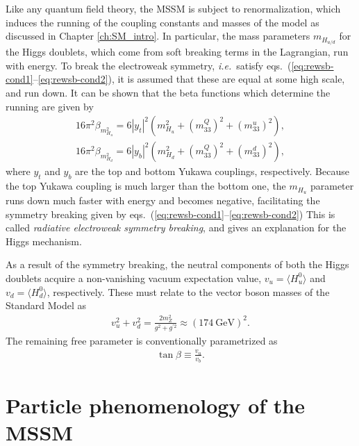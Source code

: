\documentclass[twoside,english]{uiofysmaster}
\begin{document}
Like any quantum field theory, the MSSM is subject to renormalization, which induces the running of the coupling constants and masses of the model as discussed in Chapter \ref{ch:SM_intro}. In particular, the mass parameters $m_{H_{u/d}}$ for the Higgs doublets, which come from soft breaking terms in the Lagrangian, run with energy. To break the electroweak symmetry, {\it i.e.}\ satisfy eqs.\ (\ref{eq:rewsb-cond1}--\ref{eq:rewsb-cond2}), it is assumed that these are equal at some high scale, and run down. It can be shown that the beta functions which determine the running are given by
\begin{align}
	16\pi^2 \beta_{m_{H_u}^2} = 6|y_t|^2\left( m_{H_u}^2 + ( m_{33}^Q)^2 + (m_{33}^u)^2 \right),\\
	16\pi^2 \beta_{m_{H_d}^2} = 6|y_b|^2\left( m_{H_d}^2 + ( m_{33}^Q)^2 + (m_{33}^d)^2 \right),
\end{align}
where $y_t$ and $y_b$ are the top and bottom Yukawa couplings, respectively. Because the top Yukawa coupling is much larger than the bottom one, the $m_{H_u}$ parameter runs down much faster with energy and becomes negative, facilitating the symmetry breaking given by eqs.\ (\ref{eq:rewsb-cond1}--\ref{eq:rewsb-cond2}) This is called {\it radiative electroweak symmetry breaking}, and gives an explanation for the Higgs mechanism.

As a result of the symmetry breaking, the neutral components of both the Higgs doublets acquire a non-vanishing vacuum expectation value, $v_u = \langle H_u^0 \rangle$ and $v_d = \langle H_d^0 \rangle$, respectively. These must relate to the vector boson masses of the Standard Model as
\begin{align}
	v_u^2 + v_d^2 = \frac{2m_Z^2}{g^2 + g^{'2}} \approx (174 ~\mathrm{GeV})^2.
\end{align}
The remaining free parameter is conventionally parametrized as
\begin{align}
	\tan \beta \equiv \frac{v_u}{v_b}.
\end{align}

\section{Particle phenomenology of the MSSM}
\end{document}
